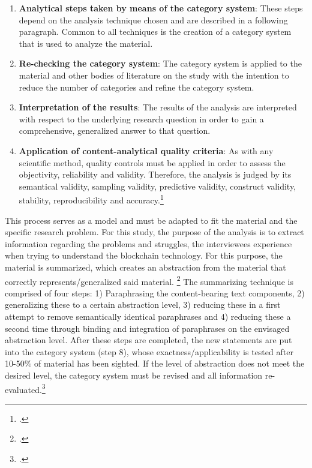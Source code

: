 \begin{enumerate}
    \item \textbf{Analytical steps taken by means of the category system}: These steps depend on the analysis technique chosen and are described in a following paragraph. Common to all techniques is the creation of a category system that is used to analyze the material.
    \item \textbf{Re-checking the category system}: The category system is applied to the material and other bodies of literature on the study with the intention to reduce the number of categories and refine the category system. 
    \item \textbf{Interpretation of the results}: The results of the analysis are interpreted with respect to the underlying research question in order to gain a comprehensive, generalized answer to that question.
    \item \textbf{Application of content-analytical quality criteria}: As with any scientific method, quality controls must be applied in order to assess the objectivity, reliability and validity. Therefore, the analysis is judged by its semantical validity, sampling validity, predictive validity, construct validity, stability, reproducibility and accuracy.\footcites[Cf.][p.40 et seqq]{MayringQualitativeContentAnalysis2014}[cf.][p.280]{Flickintroductionqualitativeresearch2009}
\end{enumerate}


This process serves as a model and must be adapted to fit the material and the specific research problem. For this study, the purpose of the analysis is to extract information regarding the problems and struggles, the interviewees experience when trying to understand the blockchain technology. For this purpose, the material is summarized, which creates an abstraction from the material that correctly represents/generalized said material. \footcite[Cf.][p.68]{MayringQualitativeContentAnalysis2014} The summarizing technique is comprised of four steps: 1) Paraphrasing the content-bearing text components, 2) generalizing these to a certain abstraction level, 3) reducing these in a first attempt to remove semantically identical paraphrases and 4) reducing these a second time through binding and integration of paraphrases on the envisaged abstraction level. After these steps are completed, the new statements are put into the category system (step 8), whose exactness/applicability is tested after 10-50\% of material has been sighted. If the level of abstraction does not meet the desired level, the category system must be revised and all information re-evaluated.\footcite[Cf.][p.68 et seq]{MayringQualitativeContentAnalysis2014}


